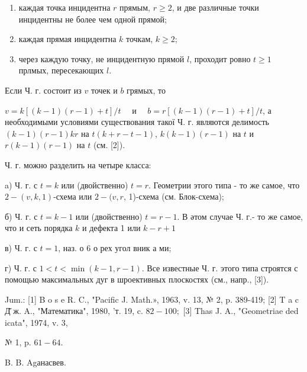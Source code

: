 \documentclass[10pt]{article}
\begin{document}
\begin{enumerate}

  \item каждая точка инцидентна $r$ прямым, $r \geqslant 2$, и две различные точки инцидентны не более чем одной прямой;



  \item каждая прямая инцидентна $k$ точкам, $k \geqslant 2$;



  \item через каждую точку, не инцидентную прямой $l$, проходит ровно $t \geqslant 1$ прлмых, пересекающих $l$.



\end{enumerate}



Если Ч. г. состоит из $v$ точек и $b$ грямых, то



$v=k[(k-1)(r-1)+t] / t \quad$ и $\quad b=r[(k-1)(r-1)+t] / t$, а необходимыми условиями существования такої Ч. г. являются делимость $(k-1)(r-1) k r$ на $t(k+r-t-1)$, $k(k-1)(r-1)$ на $t$ и $r(k-1)(r-1)$ на $t$ (см. [2]).



Ч. г. можно разделить на четыре класса:



a) Ч. г. с $t=k$ или (двойственно) $t=r$. Геометрии этого типа - то же самое, что $2-(v, k, 1)$-схема или $2-(v, r$, 1)-схема (см. Блок-схема);



б) Ч. г. с $t=k-1$ или (двойственно) $t=r-1$. В әтом случае Ч. г.- то же самое, что и сеть порядка $k$ и дефекта 1 или $k-r+1$



в) Ч. г. с $t=1$, наз. о 6 о рех угол вник а ми;



г) Ч. г. с $1<t<\min (k-1, r-1)$. Все известные Ч. г. этого типа строятся с помощью максимальных дуг в шроективных плоскостях (см., напр., [3]).



Jum.: [1] B o s e R. C., "Pacific J. Math.», 1963, v. 13, № 2, p. 389-419; [2] T a c Д̆ ж. A., "Математика", 1980, 'т. 19, c. $82-100 ;$ [3] Thas J. A., "Geometriae ded icata", 1974, v. 3,

№ 1, p. $61-64$.

B. B. Agанасвев.
\end{document}
